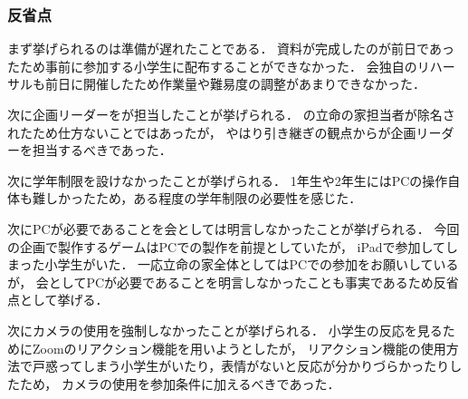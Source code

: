 \subsubsection*{反省点}
まず挙げられるのは準備が遅れたことである．
資料が完成したのが前日であったため事前に参加する小学生に配布することができなかった．
会独自のリハーサルも前日に開催したため作業量や難易度の調整があまりできなかった．

次に企画リーダーを\thirdGrade{}が担当したことが挙げられる．
\secondGrade{}の立命の家担当者が除名されたため仕方ないことではあったが，
やはり引き継ぎの観点から\secondGrade{}が企画リーダーを担当するべきであった．

次に学年制限を設けなかったことが挙げられる．
1年生や2年生にはPCの操作自体も難しかったため，ある程度の学年制限の必要性を感じた．

次にPCが必要であることを会としては明言しなかったことが挙げられる．
今回の企画で製作するゲームはPCでの製作を前提としていたが，
iPadで参加してしまった小学生がいた．
一応立命の家全体としてはPCでの参加をお願いしているが，
会としてPCが必要であることを明言しなかったことも事実であるため反省点として挙げる．

次にカメラの使用を強制しなかったことが挙げられる．
小学生の反応を見るためにZoomのリアクション機能を用いようとしたが，
リアクション機能の使用方法で戸惑ってしまう小学生がいたり，表情がないと反応が分かりづらかったりしたため，
カメラの使用を参加条件に加えるべきであった．
